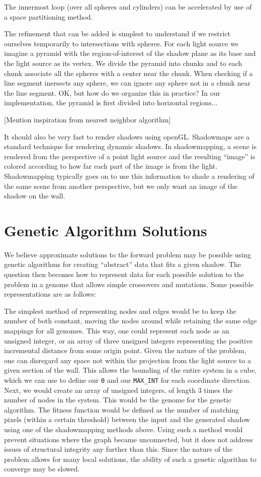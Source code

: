 \documentclass[10pt]{article}
\begin{document}
The innermost loop (over all spheres and cylinders) can be accelerated by use of a space partitioning method.

The refinement that can be added is simplest to understand if we restrict ourselves temporarily to intersections with spheres. For each light source we imagine a pyramid with the region-of-interest of the shadow plane as its base and the light source as its vertex. We divide the pyramid into chunks and to each chunk associate all the spheres with a center near the chunk. When checking if a line segment inersects any sphere, we can ignore any sphere not in a chunk near the line segment. OK, but how do we organize this in practice? In our implementation, the pyramid is first divided into horizontal regions...

[Mention inspiration from nearest neighbor algorithm]


It should also be very fast to render shadows using openGL. Shadowmaps are a standard technique for rendering dynamic shadows. In shadowmapping, a scene is rendered from the perspective of a point light source and the resulting ``image'' is colored according to how far each part of the image is from the light. Shadowmapping typically goes on to use this information to shade a rendering of the same scene from another perspective, but we only want an image of the shadow on the wall.

\section{Genetic Algorithm Solutions} \label{GA}
We believe approximate solutions to the forward problem may be possible using genetic algorithms for creating ``abstract'' data that fits a given shadow.  The question then becomes how to represent data for each possible solution to the problem in a genome that allows simple crossovers and mutations.  Some possible representations are as follows: 

The simplest method of representing nodes and edges would be to keep the number of both constant, moving the nodes around while retaining the same edge mappings for all genomes.  This way, one could represent each node as an unsigned integer, or an array of three unsigned integers representing the positive incremental distance from some origin point.  Given the nature of the problem, one can disregard any space not within the projection from the light source to a given section of the wall.  This allows the bounding of the entire system in a cube, which we can use to define our \texttt{0} and our \texttt{MAX\_INT} for each coordinate direction.  Next, we would create an array of unsigned integers, of length 3 times the number of nodes in the system.  This would be the genome for the genetic algorithm.  The fitness function would be defined as the number of matching pixels (within a certain threshold) between the input and the generated shadow using one of the shadowmapping methods above.  Using such a method would prevent situations where the graph became unconnected, but it does not address issues of structural integrity any further than this.  Since the nature of the problem allows for many local solutions, the ability of such a genetic algorithm to converge may be slowed.
\end{document}
